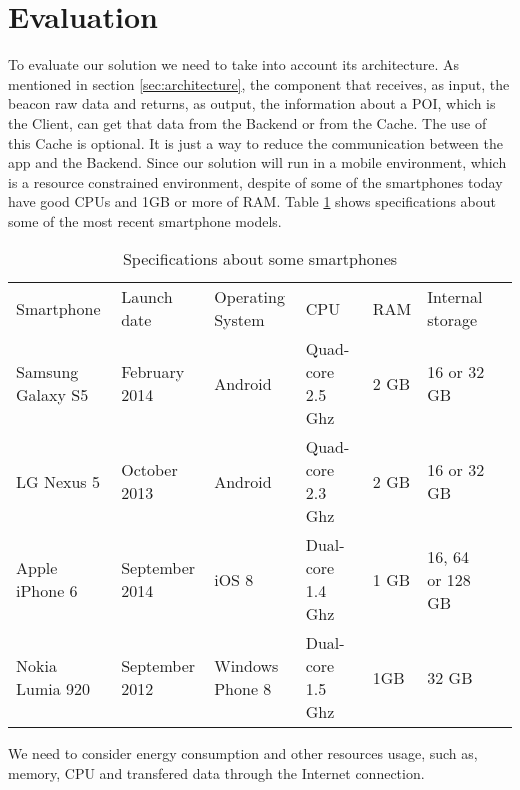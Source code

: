 
% 
% 

\section{Evaluation}
\label{sec:evaluation}


To evaluate our solution we need to take into account its
architecture. As mentioned in section \ref{sec:architecture},
the component that receives, as input, the beacon raw data and
returns, as output, the information about a POI, which is the
Client, can get that data from the Backend or from the Cache.
The use of this Cache is optional. It is just a way to reduce
the communication between the app and the Backend.
Since our solution will run in a mobile environment, 
which is a resource constrained environment,
despite of some of the smartphones today have
good CPUs and 1GB or more of RAM.
Table \ref{tab:smartphones} shows specifications about some 
of the most recent smartphone models.
\begin{table}[h]
\centering
\begin{tabular}{|l|l|l|l|l|l|l}
\cline{1-6}
Smartphone & Launch date & Operating System & CPU & RAM & Internal storage
\\
\cline{1-6}
Samsung Galaxy S5 & February 2014 & Android & Quad-core 2.5 Ghz & 2 GB & 16 or 32 GB
\\
\cline{1-6}
LG Nexus 5 & October 2013 & Android & Quad-core 2.3 Ghz & 2 GB & 16 or 32 GB
\\
\cline{1-6}
Apple iPhone 6 & September 2014 & iOS 8 & Dual-core 1.4 Ghz & 1 GB & 16, 64 or 128 GB
\\
\cline{1-6}
Nokia Lumia 920 & September 2012 & Windows Phone 8 & Dual-core 1.5 Ghz & 1GB & 32 GB
\\
\hline
\end{tabular}
\caption{Specifications about some smartphones}
\label{tab:smartphones}
\end{table}
We need to consider energy consumption and other resources
usage, such as, memory, CPU and transfered data through the
Internet connection.

